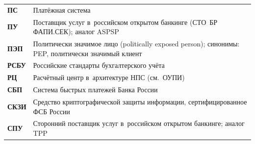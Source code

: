 \begin{longtable}{@{}p{4.5em}p{\dimexpr\linewidth-4.5em-2\tabcolsep\relax}@{}}
  \textbf{ПС}                & Платёжная система                                                                                                                                                                                                                                                                                \\
  \textbf{ПУ}                & Поставщик услуг в~российском открытом банкинге (СТО~БР ФАПИ.СЕК); аналог ASPSP                                                                                                                                                                                                                   \\
  \textbf{ПЭП}               & Политически значимое лицо (politically exposed person); синонимы: PEP, политически значимый клиент                                                                                                                                                                                                \\
  \textbf{РСБУ}              & Российские стандарты бухгалтерского учёта                                                                                                                                                                                                                                                        \\
  \textbf{РЦ}                & Расчётный центр в~архитектуре НПС (см.~ОУПИ)                                                                                                                                                                                                                                                     \\
  \textbf{СБП}               & Система быстрых платежей Банка России                                                                                                                                                                                                                                                            \\
  \textbf{СКЗИ}              & Средство криптографической защиты информации, сертифицированное ФСБ России                                                                                                                                                                                                                       \\
  \textbf{СПУ}               & Сторонний поставщик услуг в~российском открытом банкинге; аналог TPP                                                                                                                                                                                                                             \\

\end{longtable}
